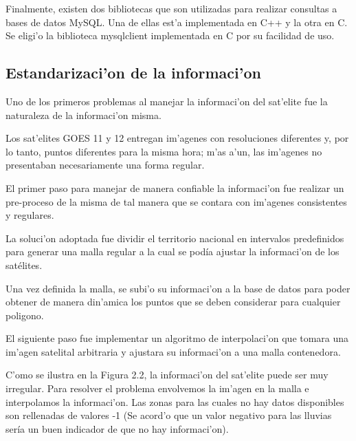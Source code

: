   Finalmente, existen dos bibliotecas que son utilizadas para realizar consultas
  a bases de datos MySQL. Una de ellas est'a implementada en C++ y la otra en C.
  Se eligi'o la biblioteca mysqlclient implementada en C por su facilidad de uso.

\subsection{Estandarizaci'on de la informaci'on}
  Uno de los primeros problemas al manejar la informaci'on del sat'elite fue la naturaleza de la informaci'on 
  misma. 

  Los sat'elites GOES 11 y 12 entregan im'agenes con resoluciones diferentes y, por lo tanto, puntos 
  diferentes para la misma hora; m'as a'un, las im'agenes no presentaban necesariamente una forma regular.

  El primer paso para manejar de manera confiable la informaci'on fue realizar un pre-proceso de la misma
  de tal manera que se contara con im'agenes consistentes y regulares.

  La soluci'on adoptada fue dividir el territorio nacional en intervalos predefinidos para generar una malla regular
  a la cual se podía ajustar la informaci'on de los satélites.

  Una vez definida la malla, se subi'o su informaci'on a la base de datos para poder obtener 
  de manera din'amica los puntos que se deben considerar para cualquier poligono. 

  El siguiente paso fue implementar un algoritmo de interpolaci'on que tomara una im'agen satelital arbitraria y 
  ajustara su informaci'on a una malla contenedora.

  C'omo se ilustra en la Figura 2.2, la informaci'on del sat'elite puede ser muy irregular. Para resolver el problema 
  envolvemos la im'agen en la malla e interpolamos la informaci'on. Las zonas para las cuales no hay datos disponibles
  son rellenadas de valores -1 (Se acord'o que un valor negativo para las lluvias sería un buen indicador de que no hay
  informaci'on).

